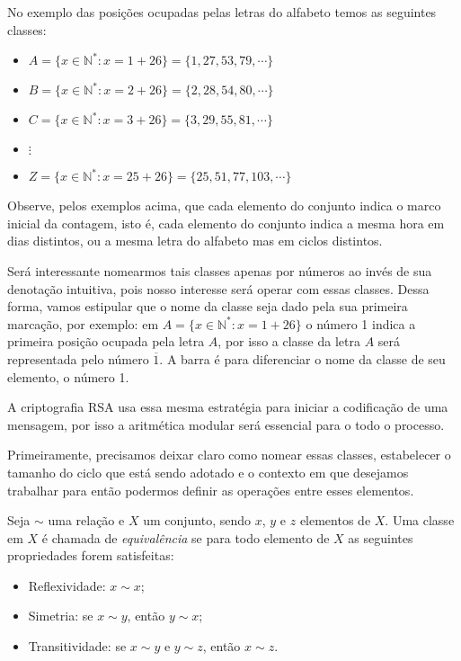 No exemplo das posi\c{c}\~{o}es ocupadas pelas letras do alfabeto temos as seguintes classes: 

\begin{itemize}
	\item $A=\{x\in\mathbb{N^*}: x=1+26\}=\{1, 27, 53, 79, \cdots\}$ 
	\item $B=\{x\in\mathbb{N^*}: x=2+26\}=\{2, 28, 54, 80, \cdots\}$
	\item $C=\{x\in\mathbb{N^*}: x=3+26\}=\{3, 29, 55, 81, \cdots\}$
	\item $\vdots$
	\item $Z=\{x\in\mathbb{N^*}: x=25+26\}=\{25, 51, 77, 103, \cdots\}$
\end{itemize}

Observe, pelos exemplos acima, que cada elemento do conjunto indica o marco inicial da contagem, isto \'{e}, cada elemento do conjunto indica a mesma hora em dias distintos, ou a mesma letra do alfabeto mas em ciclos distintos.

Ser\'{a} interessante nomearmos tais classes apenas por n\'{u}meros ao inv\'{e}s de sua denota\c{c}\~{a}o intuitiva, pois nosso interesse ser\'{a} operar com essas classes. Dessa forma, vamos estipular que o nome da classe seja dado pela sua 
primeira marca\c{c}\~{a}o, por exemplo: em $A=\{x\in\mathbb{N^*}: x=1+26\}$ o n\'{u}mero 1 indica a primeira posi\c{c}\~{a}o ocupada pela letra $A$, por isso a classe da letra $A$ ser\'{a} representada pelo n\'{u}mero $\overline{1}$. A barra \'{e} 
para diferenciar o nome da classe de seu elemento, o n\'{u}mero 1. 

A criptografia RSA usa essa mesma estrat\'{e}gia para iniciar a codifica\c{c}\~{a}o de uma mensagem, por isso a aritm\'{e}tica
modular ser\'{a} essencial para o todo o processo. 
 
Primeiramente, precisamos deixar claro como nomear essas classes, estabelecer o tamanho do ciclo que est\'a sendo adotado 
e o contexto em que desejamos trabalhar para ent\~{a}o podermos definir as opera\c{c}\~{o}es entre esses elementos.
 

\begin{Df}
	Seja $\sim$ uma rela\c{c}\~{a}o e $X$ um conjunto, sendo $x$, $y$ e $z$ elementos de $X$. 
	Uma classe em $X$ \'{e} chamada de \textsl{equival\^{e}ncia} se 
	para todo elemento de $X$ as seguintes propriedades forem satisfeitas:
	\begin{itemize}
		\item Reflexividade: $x\sim x$; 		
		\item Simetria: se $x\sim y$, ent\~{a}o $y\sim x$; 
		\item Transitividade: se $x\sim y$ e $y\sim z$, ent\~{a}o $x\sim z$.
	\end{itemize}
\end{Df}   
	
